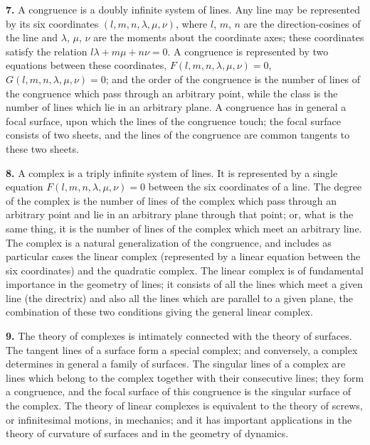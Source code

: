 \documentclass[11pt,a4paper]{book}
\begin{document}
\smallskip

\textbf{7.}\quad
A congruence is a doubly infinite system of lines. Any line may be represented by its six coordinates $(l, m, n, \lambda, \mu, \nu)$, where $l$, $m$, $n$ are the direction-cosines of the line and $\lambda$, $\mu$, $\nu$ are the moments about the coordinate axes; these coordinates satisfy the relation $l\lambda + m\mu + n\nu = 0$. A congruence is represented by two equations between these coordinates, $F(l, m, n, \lambda, \mu, \nu) = 0$, $G(l, m, n, \lambda, \mu, \nu) = 0$; and the order of the congruence is the number of lines of the congruence which pass through an arbitrary point, while the class is the number of lines which lie in an arbitrary plane. A congruence has in general a focal surface, upon which the lines of the congruence touch; the focal surface consists of two sheets, and the lines of the congruence are common tangents to these two sheets.

\textbf{8.}\quad
A complex is a triply infinite system of lines. It is represented by a single equation $F(l, m, n, \lambda, \mu, \nu) = 0$ between the six coordinates of a line. The degree of the complex is the number of lines of the complex which pass through an arbitrary point and lie in an arbitrary plane through that point; or, what is the same thing, it is the number of lines of the complex which meet an arbitrary line. The complex is a natural generalization of the congruence, and includes as particular cases the linear complex (represented by a linear equation between the six coordinates) and the quadratic complex. The linear complex is of fundamental importance in the geometry of lines; it consists of all the lines which meet a given line (the directrix) and also all the lines which are parallel to a given plane, the combination of these two conditions giving the general linear complex.

\textbf{9.}\quad
The theory of complexes is intimately connected with the theory of surfaces. The tangent lines of a surface form a special complex; and conversely, a complex determines in general a family of surfaces. The singular lines of a complex are lines which belong to the complex together with their consecutive lines; they form a congruence, and the focal surface of this congruence is the singular surface of the complex. The theory of linear complexes is equivalent to the theory of screws, or infinitesimal motions, in mechanics; and it has important applications in the theory of curvature of surfaces and in the geometry of dynamics.
\end{document}
